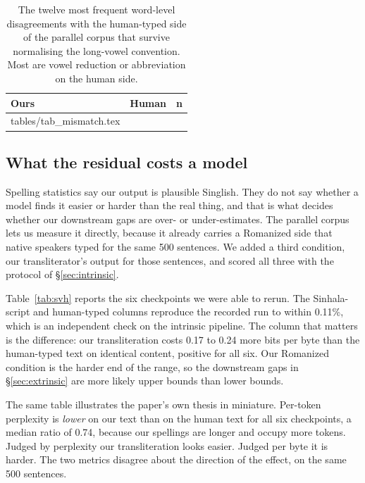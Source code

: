 \documentclass[11pt]{article}
\makeatletter
\newcommand{\rows}[1]{\@@input #1 }
\makeatother
\begin{document}
\begin{table}[t]
\centering\small
\begin{tabular}{@{}llr@{}}
\toprule
\textbf{Ours} & \textbf{Human} & \textbf{n} \\
\midrule
\rows{tables/tab_mismatch.tex}
\bottomrule
\end{tabular}
\caption{The twelve most frequent word-level disagreements with the human-typed
side of the parallel corpus that survive normalising the long-vowel convention.
Most are vowel reduction or abbreviation on the human side.}
\label{tab:mismatch}
\end{table}

\subsection{What the residual costs a model}
\label{sec:translitbias}

Spelling statistics say our output is plausible Singlish. They do not say whether
a model finds it easier or harder than the real thing, and that is what decides
whether our downstream gaps are over- or under-estimates. The parallel corpus lets
us measure it directly, because it already carries a Romanized side that native
speakers typed for the same 500 sentences. We added a third condition, our
transliterator's output for those sentences, and scored all three with the
protocol of \S\ref{sec:intrinsic}.

Table~\ref{tab:svh} reports the six checkpoints we were able to rerun. The
Sinhala-script and human-typed columns reproduce the recorded run to within
0.11\%, which is an independent check on the intrinsic pipeline. The column that
matters is the difference: our transliteration costs 0.17 to 0.24 more bits per
byte than the human-typed text on identical content, positive for all six. Our
Romanized condition is the harder end of the range, so the downstream gaps in
\S\ref{sec:extrinsic} are more likely upper bounds than lower bounds.

The same table illustrates the paper's own thesis in miniature. Per-token
perplexity is \emph{lower} on our text than on the human text for all six
checkpoints, a median ratio of 0.74, because our spellings are longer and occupy
more tokens. Judged by perplexity our transliteration looks easier. Judged per
byte it is harder. The two metrics disagree about the direction of the effect, on
the same 500 sentences.
\end{document}
